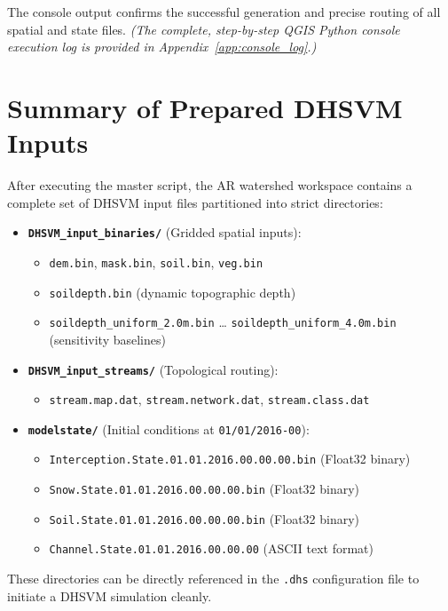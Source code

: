 \documentclass[11pt]{article}
\begin{document}
The console output confirms the successful generation and precise routing of all spatial and state files. \textit{(The complete, step-by-step QGIS Python console execution log is provided in Appendix~\ref{app:console_log}.)}


\newpage
\section{Summary of Prepared DHSVM Inputs}

After executing the master script, the AR watershed workspace contains a complete set of DHSVM input files partitioned into strict directories:

\begin{itemize}
  \item \textbf{\texttt{DHSVM\_input\_binaries/}} (Gridded spatial inputs):
        \begin{itemize}
          \item \texttt{dem.bin}, \texttt{mask.bin}, \texttt{soil.bin}, \texttt{veg.bin}
          \item \texttt{soildepth.bin} (dynamic topographic depth)
          \item \texttt{soildepth\_uniform\_2.0m.bin} \ldots{} \texttt{soildepth\_uniform\_4.0m.bin} (sensitivity baselines)
        \end{itemize}
  \item \textbf{\texttt{DHSVM\_input\_streams/}} (Topological routing):
        \begin{itemize}
          \item \texttt{stream.map.dat}, \texttt{stream.network.dat}, \texttt{stream.class.dat}
        \end{itemize}
  \item \textbf{\texttt{modelstate/}} (Initial conditions at \texttt{01/01/2016-00}):
      \begin{itemize}
        \item \texttt{Interception.State.01.01.2016.00.00.00.bin} (Float32 binary)
        \item \texttt{Snow.State.01.01.2016.00.00.00.bin} (Float32 binary)
        \item \texttt{Soil.State.01.01.2016.00.00.00.bin} (Float32 binary)
        \item \texttt{Channel.State.01.01.2016.00.00.00} (ASCII text format)
      \end{itemize}
\end{itemize}

These directories can be directly referenced in the \texttt{.dhs} configuration file to initiate a DHSVM simulation cleanly.
\end{document}
